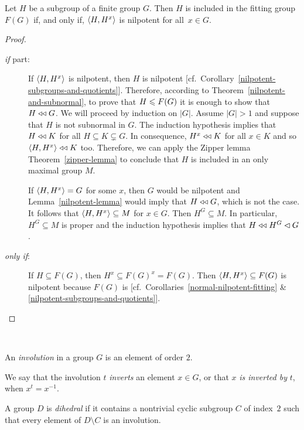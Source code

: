 \begin{thm}\label{baer-thm}{\upshape[Baer]}
    Let\/ $H$ be a subgroup of a finite group\/ $G$. Then $H$ is included in the fitting group $F(G)$ if, and only if, $\langle H,H^x\rangle$ is nilpotent for all\/~$x\in G$.
\end{thm}

\begin{proof}\ 

\begin{description}
    \item[\normalfont\textit{if\/} part:] If $\langle H,H^x\rangle$ is nilpotent, then $H$ is nilpotent [cf.~Corollary~\ref{nilpotent-subgroups-and-quotients}]. Therefore, according to Theorem~\ref{nilpotent-and-subnormal}, to prove that $H\leqslant F(G)$ it is enough to show that $H\mathrel{\triangleleft\triangleleft} G$. We will proceed by induction on $|G|$. Assume $|G|>1$ and suppose that $H$ is not subnormal in $G$. The induction hypothesis implies that $H\mathrel{\triangleleft\triangleleft} K$ for all $H\subseteq K\varsubsetneq G$. In consequence, $H^x\mathrel{\triangleleft\triangleleft} K$ for all $x\in K$ and so $\langle H,H^x\rangle\mathrel{\triangleleft\triangleleft} K$ too. Therefore, we can apply the Zipper lemma Theorem~\ref{zipper-lemma} to conclude that $H$ is included in an only maximal group $M$.

    If $\langle H,H^x\rangle=G$ for some $x$, then $G$ would be nilpotent and Lemma~\ref{nilpotent-lemma} would imply that $H\mathrel{\triangleleft\triangleleft} G$, which is not the case. It follows that $\langle H,H^x\rangle\subseteq M$ for $x\in G$. Then $H^G\subseteq M$. In particular, $H^G\subseteq M$ is proper and the induction hypothesis implies that $H\mathrel{\triangleleft\triangleleft} H^G\lhd G$.

    \item[\normalfont\textit{only if\/}:] If $H\subseteq F(G)$, then $H^x\subseteq F(G)^x=F(G)$. Then $\langle H,H^x\rangle\subseteq F(G)$ is nilpotent because $F(G)$ is [cf.~Corollaries~\ref{normal-nilpotent-fitting} \& \ref{nilpotent-subgroups-and-quotients}].
\end{description}
\end{proof}


\begin{defns}\ \label{def:dihedral-group}

    An \textsl{involution} in a group\/ $G$ is an element of order\/ $2$.

    We say that the involution $t$ \textsl{inverts} an element $x\in G$, or that $x$ \textsl{is inverted by} $t$, when $x^t=x^{-1}$.

    A group\/ $D$ is \textsl{dihedral} if it contains a nontrivial cyclic subgroup\/ $C$ of index\/~$2$ such that every element of\/ $D \setminus C$ is an involution.
\end{defns}

